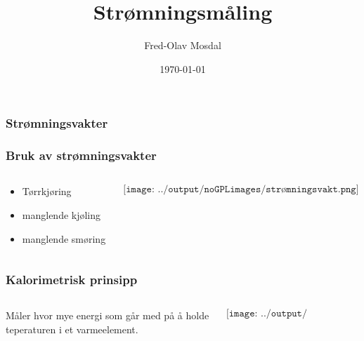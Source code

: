 \documentclass[aspectratio=169,xcolor=dvipsnames]{beamer}
\title[Flowmåling] {Strømningsmåling}
\author[Fred-Olav] {Fred-Olav Mosdal}
\institute[Gand VGS] %
{
    Gand VGS \\
    VG3 Automasjon
}
\date{\today} %
\begin{document}
\maketitle

\begin{frame}
	\frametitle{Strømningsvakter}
\end{frame}

\begin{frame}
	\frametitle{Bruk av strømningsvakter}

	\begin{columns}
		\begin{column}{0.5\textwidth}
			\begin{itemize}
				\item Tørrkjøring
				\item manglende kjøling
				\item manglende smøring
			\end{itemize}

			
		\end{column}

		\begin{column}{0.5\textwidth}
			$$\texttt{[image: ../output/noGPLimages/strømningsvakt.png]}$$
			\end{column}
		\end{columns}
\end{frame}
\begin{frame}
	\frametitle{Kalorimetrisk prinsipp}

	\begin{columns}
		\begin{column}{0.5\textwidth}
					Måler hvor mye energi som går med på å holde teperaturen i et varmeelement.

			
		\end{column}

		\begin{column}{0.5\textwidth}
			$$\texttt{[image: ../output/noGPLimages/strømning01.png]}$$
			\end{column}
		\end{columns}
\end{frame}
\end{document}
